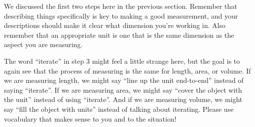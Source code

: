 \documentclass{ximera}
\begin{document}
We discussed the first two steps here in the previous section. Remember that describing things specifically is key to making a good measurement, and your descriptions should make it clear what dimension you're working in. Also remember that an appropriate unit is one that is the same dimension as the aspect you are measuring.

The word ``iterate'' in step 3 might feel a little strange here, but the goal is to again see that the process of measuring is the same for length, area, or volume. If we are measuring length, we might say ``line up the unit end-to-end'' instead of saying ``iterate''. If we are measuring area, we might say ``cover the object with the unit'' instead of using ``iterate''. And if we are measuring volume, we might say ``fill the object with units'' instead of talking about iterating. Please use vocabulary that makes sense to you and to the situation!
\end{document}
